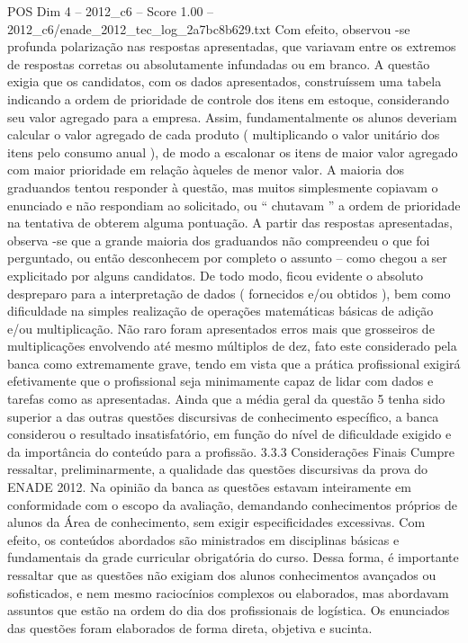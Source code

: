 \begin{textsample}{POS Dim 4 – 2012\_c6 – Score 1.00 – 2012\_c6/enade\_2012\_tec\_log\_2a7bc8b629.txt}
Com efeito, observou -se profunda polarização nas respostas apresentadas, que variavam entre os extremos de respostas corretas ou absolutamente infundadas ou em branco.
A questão exigia que os candidatos, com os dados apresentados, construíssem uma tabela indicando a ordem de prioridade de controle dos itens em estoque, considerando seu valor agregado para a empresa.
Assim, fundamentalmente os alunos deveriam calcular o valor agregado de cada produto ( multiplicando o valor unitário dos itens pelo consumo anual ), de modo a escalonar os itens de maior valor agregado com maior prioridade em relação àqueles de menor valor.
A maioria dos graduandos tentou responder à questão, mas muitos simplesmente copiavam o enunciado e não respondiam ao solicitado, ou “ chutavam ” a ordem de prioridade na tentativa de obterem alguma pontuação.
A partir das respostas apresentadas, observa -se que a grande maioria dos graduandos não compreendeu o que foi perguntado, ou então desconhecem por completo o assunto – como chegou a ser explicitado por alguns candidatos.
De todo modo, ficou evidente o absoluto despreparo para a interpretação de dados ( fornecidos e/ou obtidos ), bem como dificuldade na simples realização de operações matemáticas básicas de adição e/ou multiplicação.
Não raro foram apresentados erros mais que grosseiros de multiplicações envolvendo até mesmo múltiplos de dez, fato este considerado pela banca como extremamente grave, tendo em vista que a prática profissional exigirá efetivamente que o profissional seja minimamente capaz de lidar com dados e tarefas como as apresentadas.
Ainda que a média geral da questão 5 tenha sido superior a das outras questões discursivas de conhecimento específico, a banca considerou o resultado insatisfatório, em função do nível de dificuldade exigido e da importância do conteúdo para a profissão. 3.3.3 Considerações Finais Cumpre ressaltar, preliminarmente, a qualidade das questões discursivas da prova do ENADE 2012.
Na opinião da banca as questões estavam inteiramente em conformidade com o escopo da avaliação, demandando conhecimentos próprios de alunos da Área de conhecimento, sem exigir especificidades excessivas.
Com efeito, os conteúdos abordados são ministrados em disciplinas básicas e fundamentais da grade curricular obrigatória do curso.
Dessa forma, é importante ressaltar que as questões não exigiam dos alunos conhecimentos avançados ou sofisticados, e nem mesmo raciocínios complexos ou elaborados, mas abordavam assuntos que estão na ordem do dia dos profissionais de logística.
Os enunciados das questões foram elaborados de forma direta, objetiva e sucinta.

\end{textsample}
